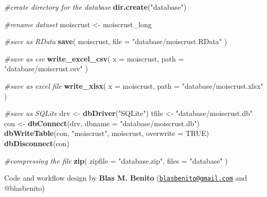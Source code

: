 \documentclass[]{article}
\newenvironment{Shaded}{\begin{snugshade}}{\end{snugshade}}
\newcommand{\CommentTok}[1]{\textcolor[rgb]{0.56,0.35,0.01}{\textit{#1}}}
\newcommand{\DataTypeTok}[1]{\textcolor[rgb]{0.13,0.29,0.53}{#1}}
\newcommand{\KeywordTok}[1]{\textcolor[rgb]{0.13,0.29,0.53}{\textbf{#1}}}
\newcommand{\NormalTok}[1]{#1}
\newcommand{\OtherTok}[1]{\textcolor[rgb]{0.56,0.35,0.01}{#1}}
\newcommand{\StringTok}[1]{\textcolor[rgb]{0.31,0.60,0.02}{#1}}
\begin{document}
\begin{Shaded}
\begin{Highlighting}[]
\CommentTok{#create directory for the database}
\KeywordTok{dir.create}\NormalTok{(}\StringTok{"database"}\NormalTok{)}

\CommentTok{#rename dataset}
\NormalTok{moiscrust <-}\StringTok{ }\NormalTok{moiscrust_long}

\CommentTok{#save as RData}
\KeywordTok{save}\NormalTok{(}
\NormalTok{  moiscrust, }
  \DataTypeTok{file =} \StringTok{"database/moiscrust.RData"}
\NormalTok{  )}

\CommentTok{#save as csv}
\KeywordTok{write_excel_csv}\NormalTok{(}
  \DataTypeTok{x =}\NormalTok{ moiscrust,}
  \DataTypeTok{path =} \StringTok{"database/moiscrust.csv"}
\NormalTok{)}

\CommentTok{#save as excel file}
\KeywordTok{write_xlsx}\NormalTok{(}
  \DataTypeTok{x =}\NormalTok{ moiscrust,}
  \DataTypeTok{path =} \StringTok{"database/moiscrust.xlsx"}
\NormalTok{)}

\CommentTok{#save as SQLite}
\NormalTok{drv <-}\StringTok{ }\KeywordTok{dbDriver}\NormalTok{(}\StringTok{"SQLite"}\NormalTok{)}
\NormalTok{tfile <-}\StringTok{ "database/moiscrust.db"}
\NormalTok{con <-}\StringTok{ }\KeywordTok{dbConnect}\NormalTok{(drv, }\DataTypeTok{dbname =} \StringTok{"database/moiscrust.db"}\NormalTok{)}
\KeywordTok{dbWriteTable}\NormalTok{(con, }\StringTok{"moiscrust"}\NormalTok{, moiscrust, }\DataTypeTok{overwrite =} \OtherTok{TRUE}\NormalTok{)}
\KeywordTok{dbDisconnect}\NormalTok{(con)}

\CommentTok{#compressing the file}
\KeywordTok{zip}\NormalTok{(}
  \DataTypeTok{zipfile =} \StringTok{"database.zip"}\NormalTok{,}
  \DataTypeTok{files =} \StringTok{"database"}
\NormalTok{  )}
\end{Highlighting}
\end{Shaded}

Code and workflow design by \textbf{Blas M. Benito}
(\href{mailto:blasbenito@gmail.com}{\nolinkurl{blasbenito@gmail.com}}
and @blasbenito)
\end{document}

